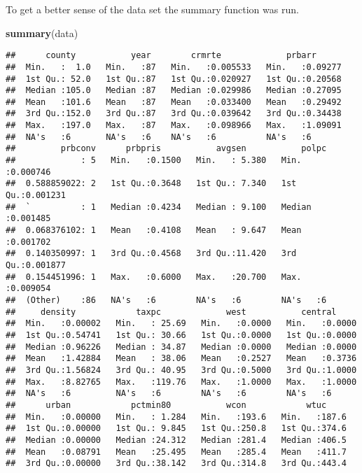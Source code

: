 \documentclass[
]{article}
\newenvironment{Shaded}{\begin{snugshade}}{\end{snugshade}}
\newcommand{\KeywordTok}[1]{\textcolor[rgb]{0.13,0.29,0.53}{\textbf{#1}}}
\newcommand{\NormalTok}[1]{#1}
\begin{document}
To get a better sense of the data set the summary function was run.

\begin{Shaded}
\begin{Highlighting}[]
\KeywordTok{summary}\NormalTok{(data)}
\end{Highlighting}
\end{Shaded}

\begin{verbatim}
##      county           year        crmrte             prbarr       
##  Min.   :  1.0   Min.   :87   Min.   :0.005533   Min.   :0.09277  
##  1st Qu.: 52.0   1st Qu.:87   1st Qu.:0.020927   1st Qu.:0.20568  
##  Median :105.0   Median :87   Median :0.029986   Median :0.27095  
##  Mean   :101.6   Mean   :87   Mean   :0.033400   Mean   :0.29492  
##  3rd Qu.:152.0   3rd Qu.:87   3rd Qu.:0.039642   3rd Qu.:0.34438  
##  Max.   :197.0   Max.   :87   Max.   :0.098966   Max.   :1.09091  
##  NA's   :6       NA's   :6    NA's   :6          NA's   :6        
##         prbconv      prbpris           avgsen           polpc         
##             : 5   Min.   :0.1500   Min.   : 5.380   Min.   :0.000746  
##  0.588859022: 2   1st Qu.:0.3648   1st Qu.: 7.340   1st Qu.:0.001231  
##  `          : 1   Median :0.4234   Median : 9.100   Median :0.001485  
##  0.068376102: 1   Mean   :0.4108   Mean   : 9.647   Mean   :0.001702  
##  0.140350997: 1   3rd Qu.:0.4568   3rd Qu.:11.420   3rd Qu.:0.001877  
##  0.154451996: 1   Max.   :0.6000   Max.   :20.700   Max.   :0.009054  
##  (Other)    :86   NA's   :6        NA's   :6        NA's   :6         
##     density            taxpc             west           central      
##  Min.   :0.00002   Min.   : 25.69   Min.   :0.0000   Min.   :0.0000  
##  1st Qu.:0.54741   1st Qu.: 30.66   1st Qu.:0.0000   1st Qu.:0.0000  
##  Median :0.96226   Median : 34.87   Median :0.0000   Median :0.0000  
##  Mean   :1.42884   Mean   : 38.06   Mean   :0.2527   Mean   :0.3736  
##  3rd Qu.:1.56824   3rd Qu.: 40.95   3rd Qu.:0.5000   3rd Qu.:1.0000  
##  Max.   :8.82765   Max.   :119.76   Max.   :1.0000   Max.   :1.0000  
##  NA's   :6         NA's   :6        NA's   :6        NA's   :6       
##      urban            pctmin80           wcon            wtuc      
##  Min.   :0.00000   Min.   : 1.284   Min.   :193.6   Min.   :187.6  
##  1st Qu.:0.00000   1st Qu.: 9.845   1st Qu.:250.8   1st Qu.:374.6  
##  Median :0.00000   Median :24.312   Median :281.4   Median :406.5  
##  Mean   :0.08791   Mean   :25.495   Mean   :285.4   Mean   :411.7  
##  3rd Qu.:0.00000   3rd Qu.:38.142   3rd Qu.:314.8   3rd Qu.:443.4  

\end{verbatim}
\end{document}

